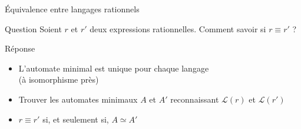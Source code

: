 
\begingroup

\begin{frame}{Équivalence entre langages rationnels}

  \begin{alertblock}{Question}
    Soient $r$ et $r'$ deux expressions rationnelles.
    Comment savoir si $r \equiv r'$ ? 
  \end{alertblock}
  
  \begin{block}{Réponse}
    \begin{itemize}
    \item L'automate minimal est unique pour chaque langage \\(à isomorphisme près)
    \item Trouver les automates minimaux $A$ et $A'$ reconnaissant $\mathcal{L}(r)$ et $\mathcal{L}(r')$ 
    \item $r \equiv r'$ si, et seulement si, $A \simeq A'$
    \end{itemize}
  \end{block}

\end{frame}

\endgroup
\endinput
